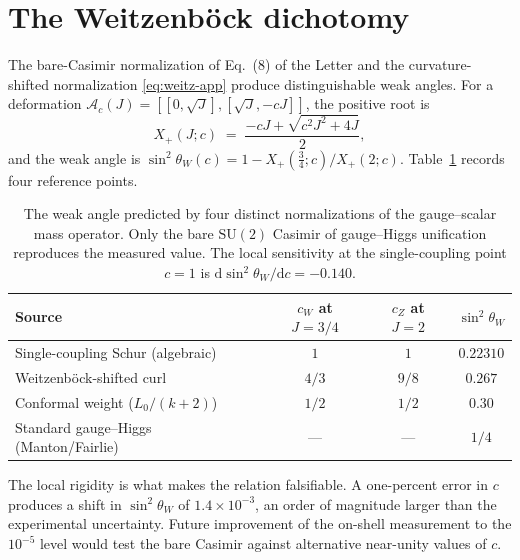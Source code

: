 \documentclass[aps,prd,onecolumn,superscriptaddress,nofootinbib,reprint]{revtex4-2}
\newcommand{\Xp}{X_{+}}
\newcommand{\sinsq}{\sin^{2}\!\theta_{W}}
\newcommand{\cA}{\mathcal{A}}
\newcommand{\SU}{\mathrm{SU}}
\newcommand{\dd}{\mathrm{d}}
\begin{document}

\section{The Weitzenb\"ock dichotomy}
\label{app:weitz}

The bare-Casimir normalization of Eq.~(8) of the Letter and the
curvature-shifted normalization \eqref{eq:weitz-app} produce
distinguishable weak angles.  For a deformation
$\cA_{c}(J)=[[0,\sqrt{J}],[\sqrt{J},-cJ]]$, the positive root is
\begin{equation}
  \Xp(J;c)\;=\;\frac{-cJ+\sqrt{c^{2}J^{2}+4J}}{2},
\label{eq:Xpc}
\end{equation}
and the weak angle is $\sinsq(c)=1-\Xp(\tfrac34;c)/\Xp(2;c)$.
Table~\ref{tab:cscan} records four reference points.

\begin{table}[h]
\centering
\begin{tabular}{lccc}
\toprule
Source & $c_{W}$ at $J=3/4$ & $c_{Z}$ at $J=2$ & $\sinsq$\\
\midrule
Single-coupling Schur (algebraic) & $1$ & $1$ & $0.22310$\\
Weitzenb\"ock-shifted curl & $4/3$ & $9/8$ & $0.267$\\
Conformal weight ($L_{0}/(k+2)$) & $1/2$ & $1/2$ & $0.30$\\
Standard gauge--Higgs (Manton/Fairlie) & --- & --- & $1/4$\\
\bottomrule
\end{tabular}
\caption{The weak angle predicted by four distinct normalizations of
the gauge--scalar mass operator.  Only the bare $\SU(2)$ Casimir of
gauge--Higgs unification reproduces the measured value.  The local
sensitivity at the single-coupling point $c=1$ is $\dd\sinsq/\dd c=-0.140$.}
\label{tab:cscan}
\end{table}

The local rigidity is what makes the relation falsifiable.  A
one-percent error in $c$ produces a shift in $\sinsq$ of $1.4\times
10^{-3}$, an order of magnitude larger than the experimental
uncertainty.  Future improvement of the on-shell measurement to the
$10^{-5}$ level would test the bare Casimir against alternative
near-unity values of $c$.
\end{document}
